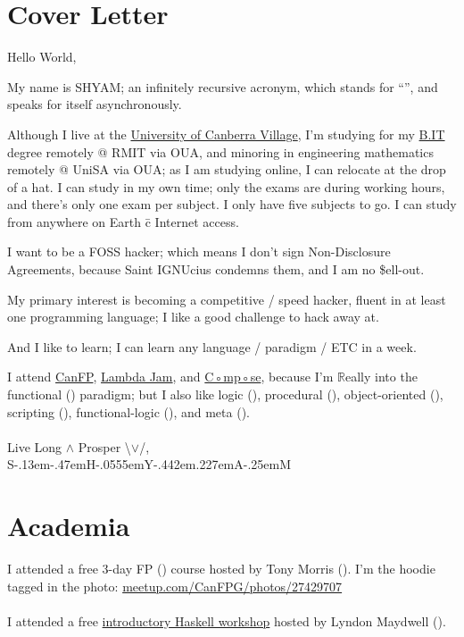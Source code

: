 \documentclass[12pt,a4paper,oneside]{article}
\def\ShYaM{\rm S\kern-.13em\lower-.47em\hbox{\fontsize{.5em}{0em}\selectfont H}\kern-.0555em{}Y\kern-.442em\lower.227em\hbox{A}\kern-.25em{}M}
\newcommand{\sh}[1]{{\color{gray}{#1}}}
\begin{document}
\section{Cover Letter}
Hello World,
\medskip\\\par{}My name is SHYAM; an infinitely recursive acronym, which stands for	``\sh{SHYAM Has Your Anomaly Mitigated}'', and speaks for itself asynchronously.%
\par{}Although I live at the \href{https://www.mystudentvillage.com/au/university-of-canberra-village/contact/}{University of Canberra Village}, I'm studying for my \href{https://www.open.edu.au/courses/it/rmit-university-bachelor-of-information-technology--rmi-cpt-deg-2017}{B.IT} degree remotely @ RMIT via OUA, and minoring in engineering mathematics remotely @ UniSA via OUA; as I am studying online, I can relocate at the drop of a hat. I can study in my own time; only the exams are during working hours, and there's only one exam per subject. I only have five subjects to go. I can study from anywhere on Earth \=c Internet access.
\\\par{}I want to be a FOSS hacker; which means I don't sign Non-Disclosure Agreements, because Saint IGNUcius condemns them, and I am no \$ell-out.
\par{}My primary interest is becoming a competitive / speed hacker, fluent in at least one programming language; I like a good challenge to hack away at.
\par{}And I like to learn; I can learn any language / paradigm / ETC in a week.
\\\par{}I attend \href{https://www.meetup.com/CanFPG/}{CanFP}, \href{http://lambdajam.yowconference.com.au/}{Lambda Jam}, and \href{http://www.composeconference.org/}{C◦mp◦se}, because I'm $\mathbb{R}$eally into the functional (\sh{Haskell}) paradigm; but I also like
logic (\sh{Prolog}),
procedural (\sh{assembly}),
object-oriented (\sh{Smalltalk \& C++; gcc \=c cpp supports inline assembly \=c portability}),
scripting (\sh{Perl}),
functional-logic (\sh{Curry \& Mercury}),
and
meta (\sh{Lisp \& ML}).
\\\medskip{}\\Live Long $\land$ Prosper \textbackslash$\lor$/,
\\\ShYaM

\vfill
\section{Academia}
I attended a free 3-day FP (\sh{Haskell}) course hosted by Tony Morris (\sh{Data61}).
I'm the hoodie tagged in the photo: \href{https://www.meetup.com/CanFPG/photos/27429707/#456137892}{meetup.com/CanFPG/photos/27429707}
\\\\I attended a free \href{http://www.composeconference.org/2017-melbourne/unconference/#introduction-to-haskell}{introductory Haskell workshop} hosted by Lyndon Maydwell (\sh{C◦mp◦se}).
\end{document}
